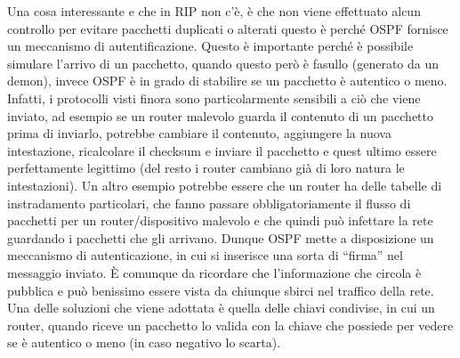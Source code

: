 Una cosa interessante e che in RIP non c’è, è che non viene effettuato alcun controllo per evitare pacchetti duplicati o alterati questo è perché OSPF fornisce un meccanismo di autentificazione. Questo è importante perché è possibile simulare l’arrivo di un pacchetto, quando questo però è fasullo (generato da un demon), invece OSPF è in grado di stabilire se un pacchetto è autentico o meno. Infatti, i protocolli visti finora sono particolarmente sensibili a ciò che viene inviato, ad esempio se un router malevolo guarda il contenuto di un pacchetto prima di inviarlo, potrebbe cambiare il contenuto, aggiungere la nuova intestazione, ricalcolare il checksum e inviare il pacchetto e quest ultimo essere perfettamente legittimo (del resto i router cambiano già di loro natura le intestazioni). Un altro esempio potrebbe essere che un router ha delle tabelle di instradamento particolari, che fanno passare obbligatoriamente il flusso di pacchetti per un router/dispositivo malevolo e che quindi può infettare la rete guardando i pacchetti che gli arrivano. Dunque OSPF mette a disposizione un meccanismo di autenticazione, in cui si inserisce una sorta di “firma” nel messaggio inviato. È comunque da ricordare che l’informazione che circola è pubblica e può benissimo essere vista da chiunque sbirci nel traffico della rete. Una delle soluzioni che viene adottata è quella delle chiavi condivise, in cui un router, quando riceve un pacchetto lo valida con la chiave che possiede per vedere se è autentico o meno (in caso negativo lo scarta).
